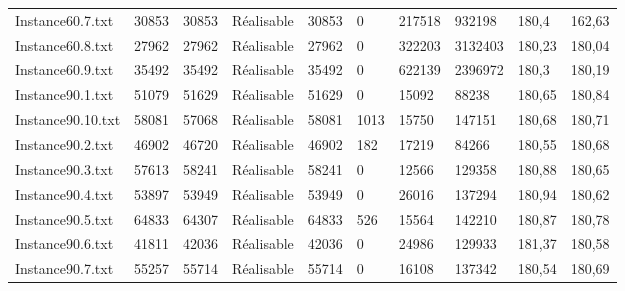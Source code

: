 \documentclass[a4paper,12pt]{article}
\theoremstyle{blueDefinition}
\theoremstyle{redProperty}
\begin{document}
\begin{table}[htbp]
\begin{tabular}{|l|p{40pt}|p{40pt}|p{55pt}|p{45pt}|p{35pt}|p{35pt}|p{35pt}|p{35pt}|p{35pt}|}
Instance60.7.txt   & 30853            & 30853               & Réalisable                & 30853              & 0          & 217518           & 932198               & 180,4            & 162,63               \\
Instance60.8.txt   & 27962            & 27962               & Réalisable                & 27962              & 0          & 322203           & 3132403              & 180,23           & 180,04               \\
Instance60.9.txt   & 35492            & 35492               & Réalisable                & 35492              & 0          & 622139           & 2396972              & 180,3            & 180,19               \\
Instance90.1.txt   & 51079            & 51629               & Réalisable                & 51629              & 0          & 15092            & 88238                & 180,65           & 180,84               \\
Instance90.10.txt  & 58081            & 57068               & Réalisable                & 58081              & 1013       & 15750            & 147151               & 180,68           & 180,71               \\
Instance90.2.txt   & 46902            & 46720               & Réalisable                & 46902              & 182        & 17219            & 84266                & 180,55           & 180,68               \\
Instance90.3.txt   & 57613            & 58241               & Réalisable                & 58241              & 0          & 12566            & 129358               & 180,88           & 180,65               \\
Instance90.4.txt   & 53897            & 53949               & Réalisable                & 53949              & 0          & 26016            & 137294               & 180,94           & 180,62               \\
Instance90.5.txt   & 64833            & 64307               & Réalisable                & 64833              & 526        & 15564            & 142210               & 180,87           & 180,78               \\
Instance90.6.txt   & 41811            & 42036               & Réalisable                & 42036              & 0          & 24986            & 129933               & 181,37           & 180,58               \\
Instance90.7.txt   & 55257            & 55714               & Réalisable                & 55714              & 0          & 16108            & 137342               & 180,54           & 180,69               \\

\end{tabular}
\end{table}
\end{document}
